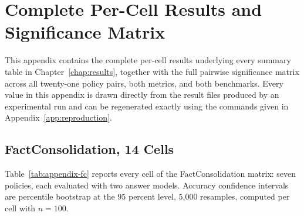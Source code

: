 \chapter{Complete Per-Cell Results and Significance Matrix}
\label{app:results}

This appendix contains the complete per-cell results underlying every summary table in Chapter~\ref{chap:results}, together with the full pairwise significance matrix across all twenty-one policy pairs, both metrics, and both benchmarks. Every value in this appendix is drawn directly from the result files produced by an experimental run and can be regenerated exactly using the commands given in Appendix~\ref{app:reproduction}.

\section{FactConsolidation, 14 Cells}
\label{sec:appendix-fc}

Table~\ref{tab:appendix-fc} reports every cell of the FactConsolidation matrix: seven policies, each evaluated with two answer models. Accuracy confidence intervals are percentile bootstrap at the 95 percent level, 5,000 resamples, computed per cell with $n = 100$.

